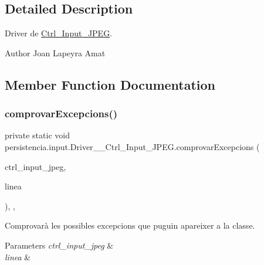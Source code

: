 \subsection{Detailed Description}
Driver de \hyperlink{classpersistencia_1_1input_1_1Ctrl__Input__JPEG}{Ctrl\+\_\+\+Input\+\_\+\+J\+P\+EG}. 

\begin{DoxyAuthor}{Author}
Joan Lapeyra Amat 
\end{DoxyAuthor}


\subsection{Member Function Documentation}
\mbox{\label{classpersistencia_1_1input_1_1Driver____Ctrl__Input__JPEG_ad40099d3188e58f93a2a57c4277b754e}} 
\subsubsection{\texorpdfstring{comprovar\+Excepcions()}{comprovarExcepcions()}}
{\footnotesize\ttfamily private static void persistencia.\+input.\+Driver\+\_\+\+\_\+\+Ctrl\+\_\+\+Input\+\_\+\+J\+P\+E\+G.\+comprovar\+Excepcions (\begin{DoxyParamCaption}\item[{\hyperlink{classpersistencia_1_1input_1_1Ctrl__Input__JPEG}{Ctrl\+\_\+\+Input\+\_\+\+J\+P\+EG}}]{ctrl\+\_\+input\+\_\+jpeg,  }\item[{String}]{linea }\end{DoxyParamCaption})\hspace{0.3cm}{\ttfamily [inline]}, {\ttfamily [static]}, {\ttfamily [private]}}



Comprovarà les possibles excepcions que puguin apareixer a la classe. 


\begin{DoxyParams}{Parameters}
{\em ctrl\+\_\+input\+\_\+jpeg} & \\
\hline
{\em linea} & \\
\hline
\end{DoxyParams}

